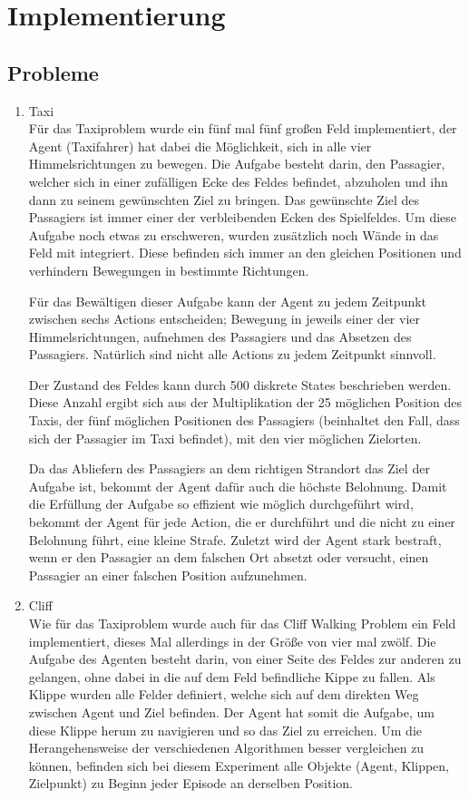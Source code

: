 \section{Implementierung}


\subsection{Probleme} \label{Probleme}

\begin{enumerate}
    \item Taxi\\
    Für das Taxiproblem wurde ein fünf mal fünf großen Feld implementiert, der Agent (Taxifahrer) hat dabei die Möglichkeit, sich in alle vier Himmelsrichtungen zu bewegen. Die Aufgabe besteht darin, den Passagier, welcher sich in einer zufälligen Ecke des Feldes befindet, abzuholen und ihn dann zu seinem gewünschten Ziel zu bringen. Das gewünschte Ziel des Passagiers ist immer einer der verbleibenden Ecken des Spielfeldes. Um diese Aufgabe noch etwas zu erschweren, wurden zusätzlich noch Wände in das Feld mit integriert. Diese befinden sich immer an den gleichen Positionen und verhindern Bewegungen in bestimmte Richtungen.

    Für das Bewältigen dieser Aufgabe kann der Agent zu jedem Zeitpunkt zwischen sechs Actions entscheiden; Bewegung in jeweils einer der vier Himmelsrichtungen, aufnehmen des Passagiers und das Absetzen des Passagiers. Natürlich sind nicht alle Actions zu jedem Zeitpunkt sinnvoll. 

    Der Zustand des Feldes kann durch 500 diskrete States beschrieben werden. Diese Anzahl ergibt sich aus der Multiplikation der 25 möglichen Position des Taxis, der fünf möglichen Positionen des Passagiers (beinhaltet den Fall, dass sich der Passagier im Taxi befindet), mit den vier möglichen Zielorten.

    Da das Abliefern des Passagiers an dem richtigen Strandort das Ziel der Aufgabe ist, bekommt der Agent dafür auch die höchste Belohnung. Damit die Erfüllung der Aufgabe so effizient wie möglich durchgeführt wird, bekommt der Agent für jede Action, die er durchführt und die nicht zu einer Belohnung führt, eine kleine Strafe. Zuletzt wird der Agent stark bestraft, wenn er den Passagier an dem falschen Ort absetzt oder versucht, einen Passagier an einer falschen Position aufzunehmen.
    \item Cliff\\
    Wie für das Taxiproblem wurde auch für das Cliff Walking Problem ein Feld implementiert, dieses Mal allerdings in der Größe von vier mal zwölf. Die Aufgabe des Agenten besteht darin, von einer Seite des Feldes zur anderen zu gelangen, ohne dabei in die auf dem Feld befindliche Kippe zu fallen. Als Klippe wurden alle Felder definiert, welche sich auf dem direkten Weg zwischen Agent und Ziel befinden. Der Agent hat somit die Aufgabe, um diese Klippe herum zu navigieren und so das Ziel zu erreichen. Um die Herangehensweise der verschiedenen Algorithmen besser vergleichen zu können, befinden sich bei diesem Experiment alle Objekte (Agent, Klippen, Zielpunkt) zu Beginn jeder Episode an derselben Position.


\end{enumerate}
